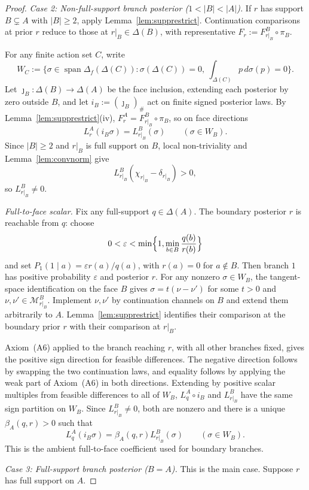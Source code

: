 \documentclass[11pt,a4paper]{article}
\theoremstyle{definition}
\newcommand{\1}{\mathbf 1}
\begin{document}
\begin{proof}
\emph{Case 2: Non-full-support branch posterior ($1<|B|<|A|$).}  If $r$ has support $B\subsetneq A$ with $|B|\ge 2$,
apply Lemma~\ref{lem:supprestrict}.  Continuation comparisons at prior $r$ reduce to those at $r|_B\in\Delta(B)$,
with representative $F_r:=F_{r|_B}^B\circ\pi_B$.

For any finite action set $C$, write
\[
W_C:=\{\sigma\in\operatorname{span}\Delta_f(\Delta(C)):\sigma(\Delta(C))=0,\ \textstyle\int_{\Delta(C)}p\,d\sigma(p)=0\}.
\]
Let $\jmath_B:\Delta(B)\to\Delta(A)$ be the face inclusion, extending each posterior by zero outside $B$, and let
$i_B:=(\jmath_B)_\#$ act on finite signed posterior laws.  By Lemma~\ref{lem:supprestrict}(iv),
$F_r^A=F_{r|_B}^B\circ\pi_B$, so on face directions
\[
L_r^A(i_B\sigma)=L_{r|_B}^B(\sigma)\qquad(\sigma\in W_B).
\]
Since $|B|\ge2$ and $r|_B$ is full support on $B$, local non-triviality and Lemma~\ref{lem:convnorm} give
\[
L_{r|_B}^B(\chi_{r|_B}-\delta_{r|_B})>0,
\]
so $L_{r|_B}^B\ne0$.

\emph{Full-to-face scalar.}  Fix any full-support $q\in\Delta(A)$.  The boundary posterior $r$ is reachable from $q$:
choose
\[
0<\varepsilon<\min\Bigl\{1,\min_{b\in B}\frac{q(b)}{r(b)}\Bigr\}
\]
and set $P_1(1\mid a)=\varepsilon r(a)/q(a)$, with $r(a)=0$ for $a\notin B$.  Then branch $1$ has positive probability
$\varepsilon$ and posterior $r$.  For any nonzero $\sigma\in W_B$, the tangent-space identification on the face $B$ gives
$\sigma=t(\nu-\nu')$ for some $t>0$ and $\nu,\nu'\in\mathcal M_{r|_B}^B$.  Implement $\nu,\nu'$ by continuation channels
on $B$ and extend them arbitrarily to $A$.  Lemma~\ref{lem:supprestrict} identifies their comparison at the boundary prior
$r$ with their comparison at $r|_B$.

Axiom~\textup{(A6)} applied to the branch reaching $r$, with all other branches fixed, gives the positive sign direction
for feasible differences.  The negative direction follows by swapping the two continuation laws, and equality follows by
applying the weak part of Axiom~\textup{(A6)} in both directions.  Extending by positive scalar multiples from feasible
differences to all of $W_B$, $L_q^A\circ i_B$ and $L_{r|_B}^B$ have the same sign partition on $W_B$.  Since
$L_{r|_B}^B\ne0$, both are nonzero and there is a unique $\beta_A(q,r)>0$ such that
\[
L_q^A(i_B\sigma)=\beta_A(q,r)L_{r|_B}^B(\sigma)\qquad(\sigma\in W_B).
\]
This is the ambient full-to-face coefficient used for boundary branches.

\emph{Case 3: Full-support branch posterior ($B=A$).}  This is the main case.  Suppose $r$ has full support on $A$.


\end{proof}
\end{document}
